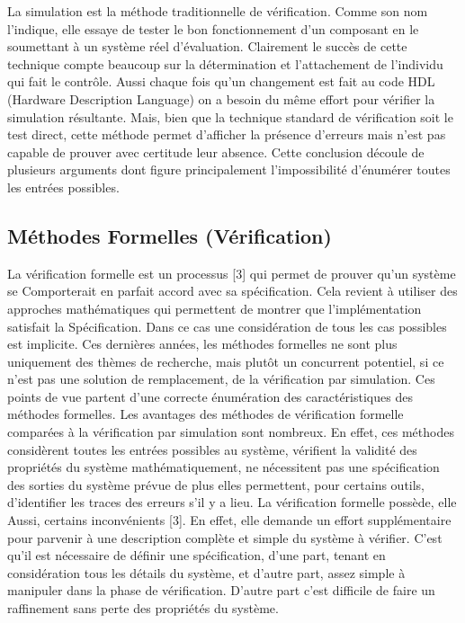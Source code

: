 \documentclass[french]{spimufcphdthesis}
\begin{document}
 La simulation est  la  méthode traditionnelle  de  vérification.  Comme  son  nom l’indique,   elle    essaye   de tester   le   bon fonctionnement    d’un    composant    en    le soumettant   à  un   système   réel   d’évaluation. Clairement  le  succès    de  cette  technique  compte beaucoup    sur  la  détermination  et  l’attachement de  l’individu  qui  fait  le  contrôle.  Aussi  chaque fois  qu'un  changement  est  fait  au  code  HDL (Hardware Description Language) on a besoin du même   effort   pour   vérifier   la   simulation résultante.  Mais,  bien  que  la  technique  standard de  vérification  soit  le  test  direct,    cette  méthode permet d’afficher la présence d’erreurs mais n’est pas  capable  de  prouver  avec  certitude  leur absence.  Cette  conclusion  découle  de  plusieurs arguments dont figure principalement l’impossibilité   d’énumérer   toutes   les   entrées possibles.  

\subsection{Méthodes Formelles (Vérification)}

 La vérification formelle    est un processus [3] qui   permet   de   prouver   qu’un   système   se 
Comporterait    en    parfait    accord    avec    sa spécification.   Cela   revient   à   utiliser   des approches mathématiques qui permettent de montrer   que   l’implémentation   satisfait   la  
Spécification. Dans ce cas une considération de tous les cas possibles est implicite. Ces dernières années, les méthodes formelles ne sont plus uniquement des thèmes de recherche, mais plutôt un concurrent potentiel, si ce n’est pas une solution de remplacement, de la vérification par simulation. Ces points de vue partent d’une correcte énumération des caractéristiques des méthodes formelles. Les avantages des méthodes de vérification formelle comparées à la vérification par simulation sont nombreux. En effet, ces méthodes considèrent toutes les entrées possibles au système, vérifient la validité des propriétés du système mathématiquement, ne nécessitent pas une spécification des sorties du système prévue de plus elles permettent, pour certains outils, d’identifier les traces des erreurs s’il y a lieu. La vérification formelle possède, elle 
Aussi, certains inconvénients [3]. En effet, elle demande un effort supplémentaire pour parvenir à une description complète et simple du système à vérifier. C’est qu’il est nécessaire de définir une spécification, d’une part, tenant en considération tous les détails du système, et d’autre part, assez simple à manipuler dans la phase de vérification. D’autre part c’est difficile de faire un raffinement sans perte des propriétés du système. 
\end{document}

